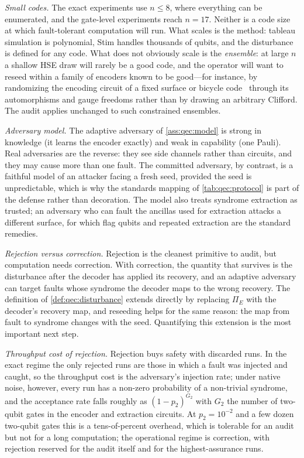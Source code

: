 \emph{Small codes.} The exact experiments use $n\le 8$, where everything can be enumerated, and the gate-level experiments reach $n=17$. Neither is a code size at which fault-tolerant computation will run. What scales is the method: tableau simulation is polynomial, Stim handles thousands of qubits, and the disturbance is defined for any code. What does not obviously scale is the \emph{ensemble}: at large $n$ a shallow HSE draw will rarely be a good code, and the operator will want to reseed within a family of encoders known to be good---for instance, by randomizing the encoding circuit of a fixed surface or bicycle code~\cite{fowler2012surfacecodes,bravyi2024bicycle} through its automorphisms and gauge freedoms rather than by drawing an arbitrary Clifford. The audit applies unchanged to such constrained ensembles.

\emph{Adversary model.} The adaptive adversary of \cref{ass:qec:model} is strong in knowledge (it learns the encoder exactly) and weak in capability (one Pauli). Real adversaries are the reverse: they see side channels rather than circuits, and they may cause more than one fault. The committed adversary, by contrast, is a faithful model of an attacker facing a fresh seed, provided the seed is unpredictable, which is why the standards mapping of \cref{tab:qec:protocol} is part of the defense rather than decoration. The model also treats syndrome extraction as trusted; an adversary who can fault the ancillas used for extraction attacks a different surface, for which flag qubits and repeated extraction are the standard remedies.

\emph{Rejection versus correction.} Rejection is the cleanest primitive to audit, but computation needs correction. With correction, the quantity that survives is the disturbance after the decoder has applied its recovery, and an adaptive adversary can target faults whose syndrome the decoder maps to the wrong recovery. The definition of \cref{def:qec:disturbance} extends directly by replacing $\Pi_E$ with the decoder's recovery map, and reseeding helps for the same reason: the map from fault to syndrome changes with the seed. Quantifying this extension is the most important next step.

\emph{Throughput cost of rejection.} Rejection buys safety with discarded runs. In the exact regime the only rejected runs are those in which a fault was injected and caught, so the throughput cost is the adversary's injection rate; under native noise, however, every run has a non-zero probability of a non-trivial syndrome, and the acceptance rate falls roughly as $(1-p_2)^{G_2}$ with $G_2$ the number of two-qubit gates in the encoder and extraction circuits. At $p_2=10^{-2}$ and a few dozen two-qubit gates this is a tens-of-percent overhead, which is tolerable for an audit but not for a long computation; the operational regime is correction, with rejection reserved for the audit itself and for the highest-assurance runs.

